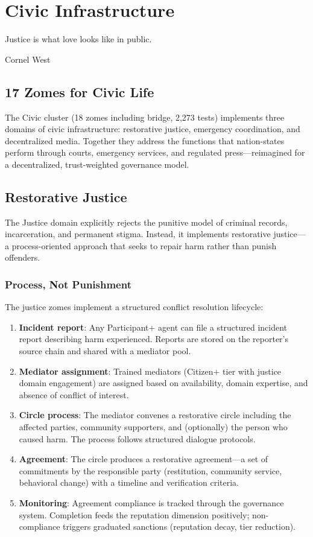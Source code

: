\documentclass[12pt]{book}
\begin{document}
\chapter{Civic Infrastructure}
\label{ch:civic}

\epigraph{Justice is what love looks like in public.}{Cornel West}

\section{17 Zomes for Civic Life}

The Civic cluster (18 zomes including bridge, 2,273 tests) implements three
domains of civic infrastructure: restorative justice, emergency coordination,
and decentralized media. Together they address the functions that nation-states
perform through courts, emergency services, and regulated press---reimagined
for a decentralized, trust-weighted governance model.

\section{Restorative Justice}

The Justice domain explicitly rejects the punitive model of criminal records,
incarceration, and permanent stigma. Instead, it implements restorative
justice---a process-oriented approach that seeks to repair harm rather than
punish offenders.

\subsection{Process, Not Punishment}

The justice zomes implement a structured conflict resolution lifecycle:

\begin{enumerate}
  \item \textbf{Incident report}: Any Participant+ agent can file a structured
    incident report describing harm experienced. Reports are stored on the
    reporter's source chain and shared with a mediator pool.
  \item \textbf{Mediator assignment}: Trained mediators (Citizen+ tier with
    justice domain engagement) are assigned based on availability, domain
    expertise, and absence of conflict of interest.
  \item \textbf{Circle process}: The mediator convenes a restorative circle
    including the affected parties, community supporters, and (optionally)
    the person who caused harm. The process follows structured dialogue
    protocols.
  \item \textbf{Agreement}: The circle produces a restorative agreement---a
    set of commitments by the responsible party (restitution, community
    service, behavioral change) with a timeline and verification criteria.
  \item \textbf{Monitoring}: Agreement compliance is tracked through the
    governance system. Completion feeds the reputation dimension positively;
    non-compliance triggers graduated sanctions (reputation decay, tier
    reduction).
\end{enumerate}
\end{document}
